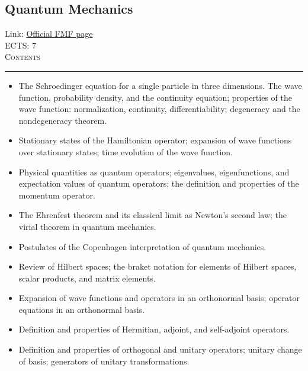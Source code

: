 \documentclass[11pt, a4paper]{article}
\newenvironment{course}[3]{
\subsection{#1}%
Link: \href{#2}{Official FMF page}\\%
ECTS: #3%
\vspace{1ex}
\\
{\large \textsc{Contents}}\\[-0.9ex]%
\rule{\textwidth}{0.5pt}
\vspace{-3ex}
}
{}
\newenvironment{chapter}[1]{
\begin{tcolorbox}[title=#1, breakable]
}
{\end{tcolorbox}}
\begin{document}
\begin{course}{Quantum Mechanics}{https://www.fmf.uni-lj.si/en/study-physics/programmes/1fiz/2020/7000777/courses/1156/}{7}
    \label{quantum-mechanics}

    \begin{chapter}{Fundamentals of quantum mechanics}
        \begin{itemize}
            \item The Schroedinger equation for a single particle in three dimensions. The wave function, probability density, and the continuity equation; properties of the wave function: normalization, continuity, differentiability; degeneracy and the nondegeneracy theorem.

            \item Stationary states of the Hamiltonian operator; expansion of wave functions over stationary states; time evolution of the wave function.

            \item Physical quantities as quantum operators; eigenvalues, eigenfunctions, and expectation values of quantum operators; the definition and properties of the momentum operator.

            \item The Ehrenfest theorem and its classical limit as Newton's second law; the virial theorem in quantum mechanics.

            
        \end{itemize}
    \end{chapter}

    \begin{chapter}{The Dirac formalism}
        \begin{itemize}

            \item Postulates of the Copenhagen interpretation of quantum mechanics.

            \item Review of Hilbert spaces; the braket notation for elements of Hilbert spaces, scalar products, and matrix elements.

            \item Expansion of wave functions and operators in an orthonormal basis; operator equations in an orthonormal basis.

            \item Definition and properties of Hermitian, adjoint, and self-adjoint operators.

            \item Definition and properties of orthogonal and unitary operators; unitary change of basis; generators of unitary transformations.


\end{itemize}
\end{chapter}
\end{course}
\end{document}

